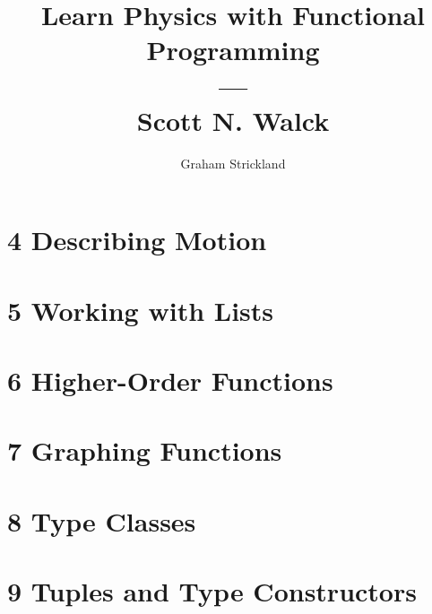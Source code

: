 \documentclass{article}
\title{Learn Physics with Functional Programming\\---\\Scott N. Walck}
\author{Graham Strickland}
\begin{document}
\maketitle  

\section*{4 Describing Motion}


\section*{5 Working with Lists}


\section*{6 Higher-Order Functions}


\section*{7 Graphing Functions}


\section*{8 Type Classes}


\section*{9 Tuples and Type Constructors}

\end{document}
